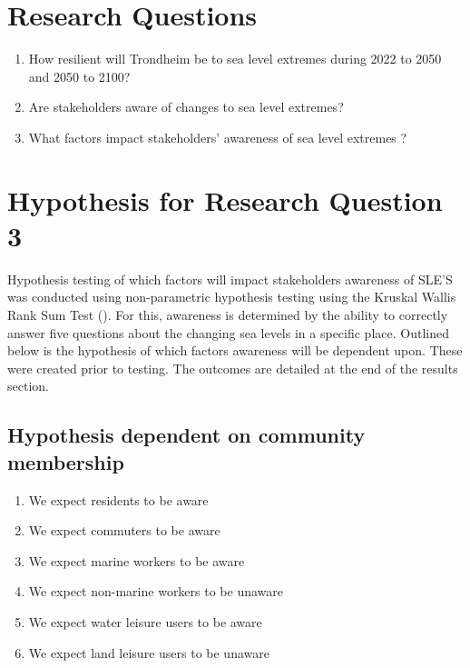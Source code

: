\section{Research Questions}
\begin{enumerate}
    \item How resilient will Trondheim be to sea level extremes during 2022 to 2050 and 2050 to 2100?
    \item Are stakeholders aware of changes to sea level extremes?
    \item What factors impact stakeholders’ awareness of sea level extremes ?
\end{enumerate}



\section{Hypothesis for Research Question 3}
Hypothesis testing  of which factors will impact stakeholders awareness of SLE'S was conducted using non-parametric hypothesis testing using the Kruskal Wallis Rank Sum Test (\cite{hollander_nonparametric_2014}). For this, awareness is determined by the ability to correctly answer five questions about the changing sea levels in a specific place. Outlined below is the hypothesis of which factors awareness will be dependent upon. These were created prior to testing. The outcomes are detailed at the end of the results section. 

\subsection{Hypothesis dependent on community membership}
\begin{enumerate}
    \item We expect residents to be aware
    \item We expect commuters to be aware
    \item We expect marine workers to be aware
    \item We expect non-marine workers to be unaware
    \item We expect water leisure users to be aware
    \item We expect land leisure users to be unaware
    \end{enumerate}
\paragraph{}

